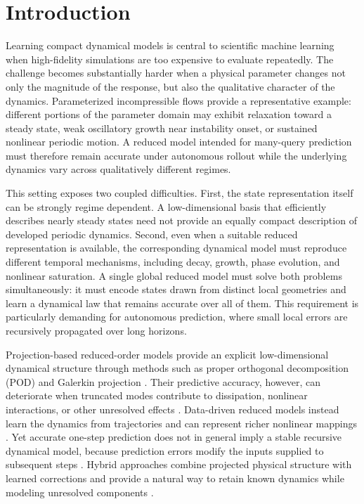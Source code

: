 \section{Introduction}

Learning compact dynamical models is central to scientific machine learning when
high-fidelity simulations are too expensive to evaluate repeatedly.
The challenge becomes substantially harder when a physical parameter changes not only the
magnitude of the response, but also the qualitative character of the dynamics.
Parameterized incompressible flows provide a representative example: different portions of
the parameter domain may exhibit relaxation toward a steady state, weak oscillatory growth
near instability onset, or sustained nonlinear periodic motion.
A reduced model intended for many-query prediction must therefore remain accurate under
autonomous rollout while the underlying dynamics vary across qualitatively different
regimes.

This setting exposes two coupled difficulties.
First, the state representation itself can be strongly regime dependent.
A low-dimensional basis that efficiently describes nearly steady states need not provide an
equally compact description of developed periodic dynamics.
Second, even when a suitable reduced representation is available, the corresponding
dynamical model must reproduce different temporal mechanisms, including decay, growth,
phase evolution, and nonlinear saturation.
A single global reduced model must solve both problems simultaneously: it must encode
states drawn from distinct local geometries and learn a dynamical law that remains accurate
over all of them.
This requirement is particularly demanding for autonomous prediction, where small local
errors are recursively propagated over long horizons.

Projection-based reduced-order models provide an explicit low-dimensional dynamical
structure through methods such as proper orthogonal decomposition (POD) and Galerkin
projection \citep{sirovich1987,berkooz1993,benner2015}.
Their predictive accuracy, however, can deteriorate when truncated modes contribute to
dissipation, nonlinear interactions, or other unresolved effects \citep{amsallem2012}.
Data-driven reduced models instead learn the dynamics from trajectories and can represent
richer nonlinear mappings \citep{hesthaven2018,pathak2018,vlachas2018,lu2021,kovachki2023}.
Yet accurate one-step prediction does not in general imply a stable recursive dynamical
model, because prediction errors modify the inputs supplied to subsequent steps
\citep{duraisamy2019,brunton2020}.
Hybrid approaches combine projected physical structure with learned corrections and provide
a natural way to retain known dynamics while modeling unresolved components
\citep{dar2023,lee2020,fresca2022,geelen2023}.

